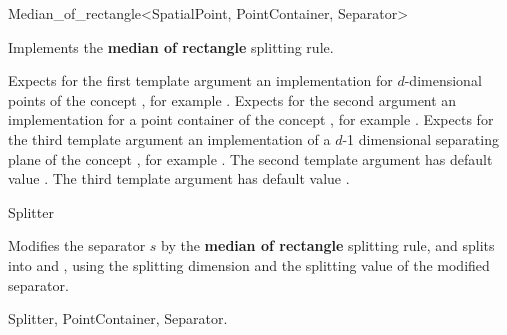 
\begin{ccRefFunctionObjectClass}{Median_of_rectangle<SpatialPoint, PointContainer, Separator>}  %

\ccDefinition
Implements the {\bf median of rectangle} splitting rule.

\ccParameters

Expects for the first template argument an implementation for
$d$-dimensional points of
the concept , 
for example . Expects for the second argument an implementation
for a point container of the concept , for example .
Expects for the third template argument an implementation of a $d$-1 dimensional 
separating plane of the concept , for example .
The second template argument has default value .
The third template argument has default value . 


\ccIsModel

Splitter

\ccTypes



\ccOperations

{Modifies the separator $s$ by the {\bf median of rectangle} splitting rule, 
and splits  into  and ,
using the splitting dimension and the splitting value of the modified separator.
}

\ccSeeAlso

Splitter, PointContainer, Separator.
\end{ccRefFunctionObjectClass}





